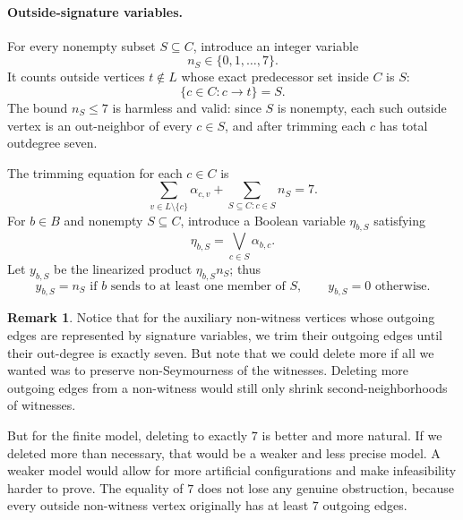 \documentclass[a4paper,fleqn]{cas-sc}
\theoremstyle{definition}
\newtheorem{remark}[theorem]{Remark}
\begin{document}
\paragraph{Outside-signature variables.}
For every nonempty subset $S\subseteq C$, introduce an integer variable
\[
n_S\in\{0,1,\ldots,7\}.
\]
It counts outside vertices $t\notin L$ whose exact predecessor set inside $C$ is $S$:
\[
\{c\in C:c\to t\}=S.
\]
The bound $n_S\le 7$ is harmless and valid: since $S$ is nonempty, each such outside vertex is an out-neighbor of every $c\in S$, and after trimming each $c$ has total outdegree seven.

The trimming equation for each $c\in C$ is
\begin{equation}\label{eq:r6-trim}
\sum_{v\in L\setminus\{c\}}\alpha_{c,v}+
\sum_{S\subseteq C:c\in S}n_S=7.
\end{equation}
For $b\in B$ and nonempty $S\subseteq C$, introduce a Boolean variable $\eta_{b,S}$ satisfying
\[
\eta_{b,S}=\bigvee_{c\in S}\alpha_{b,c}.
\]
Let $y_{b,S}$ be the linearized product $\eta_{b,S}n_S$; thus
\[
y_{b,S}=n_S\text{ if }b\text{ sends to at least one member of }S,
\qquad
 y_{b,S}=0\text{ otherwise}.
\]
\begin{remark}
Notice that for the auxiliary non-witness vertices whose outgoing edges are represented by signature variables, we trim their outgoing edges until their out-degree is exactly seven. But note that we could delete more if all we wanted was to preserve non-Seymourness of the witnesses. Deleting more outgoing edges from a non-witness would still only shrink second-neighborhoods of witnesses.

But for the finite model, deleting to exactly $7$ is better and more natural. If we deleted more than necessary, that would be a weaker and less precise model. A weaker model would allow for more artificial configurations and make infeasibility harder to prove. The equality of $7$ does not lose any genuine obstruction, because every outside non-witness vertex originally has at least $7$ outgoing edges.
\end{remark}
\end{document}
